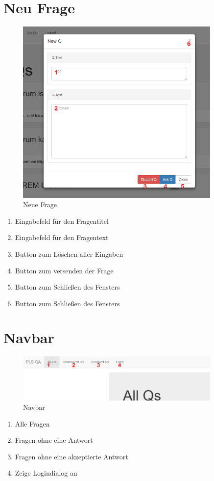 \documentclass[a4paper]{report}
\begin{document}
\section{Neu Frage}
\begin{figure}[h!]
	\centering
	\includegraphics[width=0.9\textwidth]{NewQ.PNG}
	\caption{Neue Frage}
	\label{fig:NeueFrage}
\end{figure}
\centering\begin{enumerate}
	\item Eingabefeld für den Fragentitel
	\item Eingabefeld für den Fragentext
	\item Button zum Löschen aller Eingaben
	\item Button zum versenden der Frage
	\item Button zum Schließen des Fensters
	\item Button zum Schließen des Fensters
\end{enumerate}
\newpage

\section{Navbar}
\begin{figure}[h!]
	\centering
	\includegraphics[width=0.9\textwidth]{navbar.PNG}
	\caption{Navbar}
	\label{fig:navbar1}
\end{figure}
\centering\begin{enumerate}
	\item Alle Fragen
	\item Fragen ohne eine Antwort
	\item Fragen ohne eine akzeptierte Antwort
	\item Zeige Logindialog an
\end{enumerate}
\end{document}
